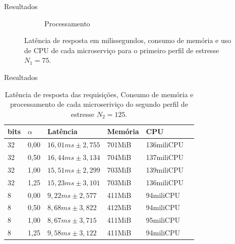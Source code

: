 \begin{frame}{Resultados}
\begin{figure}[H]
\begin{subfigure}[b]{0.32\textwidth}
            \caption{\scriptsize{Processamento}}
        \end{subfigure}
        \caption{\scriptsize{Latência de resposta em milissegundos, consumo de memória e uso de CPU de cada microserviço para o primeiro perfil de estresse $N_1 = 75$.}}
        \end{figure}
\end{frame}


\begin{frame}{Resultados}
    \scriptsize
    \begin{table}[H]
        \caption{\scriptsize{Latência de resposta das requisições, Consumo de memória e processamento de cada microseriviço do segundo perfil de estresse $N_2 = 125$.}}
        \centering
        \begin{tabular}{llllll} \\
        \hline
        \textbf{bits} & \textbf{$\alpha$}  &  \textbf{Latência} & \textbf{Memória} &\textbf{CPU}\\  \hline
        32 &0,00& $16,01ms \pm 2,755$ & 701MiB & 136miliCPU\\
        32 &0,50& $16,44ms \pm 3,134$ & 704MiB & 137miliCPU\\
        32 &1,00& $15,51ms \pm 2,299$ & 703MiB & 139miliCPU\\
        32 &1,25& $15,23ms \pm 3,101$ & 703MiB & 136miliCPU\\
        8  &0,00& $9,22ms \pm 2,577$ & 411MiB & 94miliCPU\\
        8  &0,50& $8,68ms \pm 3,822$ & 412MiB & 94miliCPU\\
        8  &1,00& $8,67ms \pm 3,715$ & 411MiB & 95miliCPU\\
        8  &1,25& $9,58ms \pm 3,122$ & 411MiB & 94miliCPU\\
        \hline
        \end{tabular}
        \end{table}
\end{frame}

